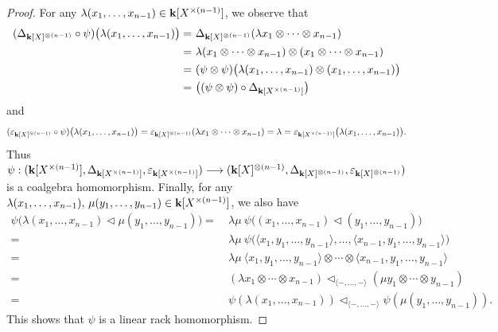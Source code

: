 \documentclass[a4paper,reqno,10pt]{amsart}
\theoremstyle{plain}
\theoremstyle{definition}
\theoremstyle{remark}
\begin{document}
\begin{proof}
    For any $\lambda (x_1, \ldots, x_{n-1}) \in {\bf k} [ X^{\times (n-1)} ]$, we observe that
    \begin{align*}
        (\Delta_{{\bf k} [X]^{\otimes (n-1)} } \circ \psi) \big( \lambda (x_1, \ldots, x_{n-1}) \big) =~& \Delta_{{\bf k} [X]^{\otimes (n-1)} } ( \lambda x_1 \otimes \cdots \otimes x_{n-1}) \\
        =~& \lambda (x_1 \otimes \cdots \otimes x_{n-1}) \otimes (x_1 \otimes \cdots \otimes x_{n-1}) \\
        =~& (\psi \otimes \psi) \big(  \lambda (x_1, \ldots, x_{n-1}) \otimes   (x_1, \ldots, x_{n-1})  \big) \\
        =~& \big( (\psi \otimes \psi) \circ \Delta_{{\bf k} [X^{\times (n-1)}]}    \big)
    \end{align*}
    and 
    \begin{align*}
         ( \varepsilon_{{\bf k} [X]^{\otimes (n-1)} } \circ \psi) \big( \lambda (x_1, \ldots, x_{n-1}) \big) = \varepsilon_{{\bf k} [X]^{\otimes (n-1)} } (\lambda x_1 \otimes \cdots \otimes x_{n-1}) = \lambda = \varepsilon_{{\bf k} [X^{\times (n-1)}]} \big( \lambda (x_1, \ldots, x_{n-1}) \big).
    \end{align*}
    Thus $\psi : ( {\bf k}[X^{\times (n-1)} ], \Delta_{{\bf k} [X^{\times (n-1)}] }, \varepsilon_{ {\bf k} [X^{\times (n-1)}]}  ) \longrightarrow ( {\bf k} [X]^{\otimes (n-1)}, \Delta_{{\bf k} [X]^{\otimes (n-1)} } , \varepsilon_{{\bf k} [X]^{\otimes (n-1)} }  )$ is a coalgebra homomorphism. Finally, for any $\lambda (x_1, \ldots, x_{n-1}), ~\! \mu (y_1, \ldots, y_{n-1}) \in {\bf k} [X^{\times (n-1)}]$, we also have
    \begin{align*}
        \psi \big( \lambda (x_1, \ldots, x_{n-1}) \triangleleft  \mu (y_1, \ldots, y_{n-1})   \big) 
        =~& \lambda \mu ~\! \psi \big( (x_1, \ldots, x_{n-1}) \triangleleft (y_1, \ldots, y_{n-1})   \big) \\
        =~& \lambda \mu ~\! \psi \big( \langle x_1, y_1, \ldots, y_{n-1} \rangle, \ldots,  \langle x_{n-1}, y_1, \ldots, y_{n-1} \rangle    \big) \\
        =~& \lambda \mu ~\! \langle x_1, y_1, \ldots, y_{n-1} \rangle \otimes \cdots \otimes  \langle x_{n-1}, y_1, \ldots, y_{n-1} \rangle  \\
        =~& (\lambda x_1 \otimes \cdots \otimes x_{n-1}) \triangleleft_{ \langle - , \ldots , - \rangle} ( \mu y_1 \otimes \cdots \otimes y_{n-1} ) \\
        =~& \psi (  \lambda (x_1, \ldots, x_{n-1})) \triangleleft_{ \langle -, \ldots, - \rangle }  \psi ( \mu (y_1, \ldots, y_{n-1}) ).
    \end{align*}
    This shows that $\psi$ is a linear rack homomorphism.
\end{proof}
\end{document}
